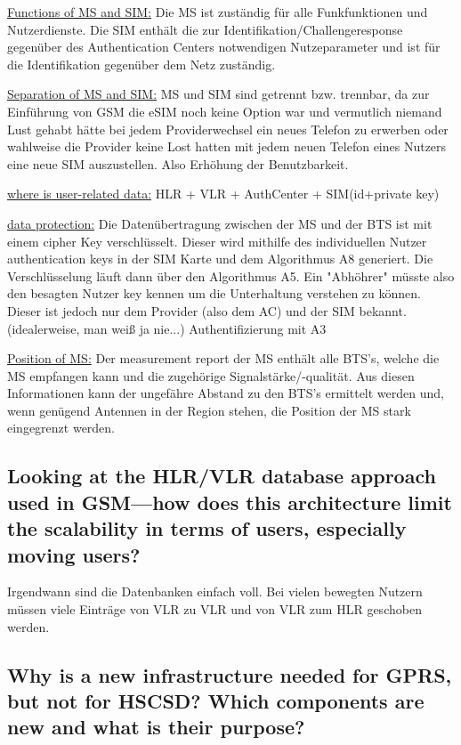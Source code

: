 \underline{Functions of MS and SIM:} Die MS ist zuständig für alle Funkfunktionen und Nutzerdienste.
Die SIM enthält die zur Identifikation/Challengeresponse gegenüber des Authentication Centers notwendigen Nutzeparameter und ist für die Identifikation gegenüber dem Netz zuständig.

\underline{Separation of MS and SIM:} MS und SIM sind getrennt bzw. trennbar, da zur Einführung von GSM die eSIM noch keine Option war und vermutlich niemand Lust gehabt hätte bei jedem Providerwechsel ein neues Telefon zu erwerben oder wahlweise die Provider keine Lost hatten mit jedem neuen Telefon eines Nutzers eine neue SIM auszustellen. Also Erhöhung der Benutzbarkeit.

\underline{where is user-related data:} HLR + VLR + AuthCenter + SIM(id+private key)

\underline{data protection:} Die Datenübertragung zwischen der MS und der BTS ist mit einem cipher Key verschlüsselt. Dieser wird mithilfe des individuellen Nutzer authentication keys in der SIM Karte und dem Algorithmus A8 generiert. Die Verschlüsselung läuft dann über den Algorithmus A5. Ein "Abhöhrer" müsste also den besagten Nutzer key kennen um die Unterhaltung verstehen zu können. Dieser ist jedoch nur dem Provider (also dem AC) und der SIM bekannt. (idealerweise, man weiß ja nie...) Authentifizierung mit A3

\underline{Position of MS:} Der measurement report der MS enthält alle BTS's, welche die MS empfangen kann und die zugehörige Signalstärke/-qualität. Aus diesen Informationen kann der ungefähre Abstand zu den BTS's ermittelt werden und, wenn genügend Antennen in der Region stehen, die Position der MS stark eingegrenzt werden.

\subsection{Looking at the HLR/VLR database approach used in GSM—how does this architecture limit the scalability in terms of users, especially moving users?}

Irgendwann sind die Datenbanken einfach voll. 
Bei vielen bewegten Nutzern müssen viele Einträge von VLR zu VLR und von VLR zum HLR geschoben werden.

\subsection{Why is a new infrastructure needed for GPRS, but not for HSCSD? Which components are new and what is their purpose?}

